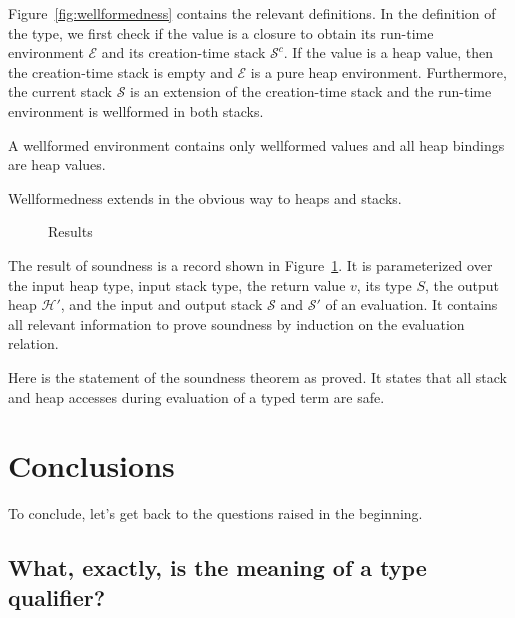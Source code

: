 \documentclass[sigplan,review,dvipsnames,screen,10pt]{acmart}
\begin{document}
Figure~\ref{fig:wellformedness} contains the relevant definitions. In
the definition of the {\AWellformed} type, we first check if the value
is a closure to obtain its run-time environment $\mathcal{E}$ and its
creation-time stack $\mathcal{S}^c$. If the value is a heap value,
then the creation-time stack is empty and $\mathcal{E}$ is a pure heap
environment. Furthermore, the current stack $\mathcal{S}$ is an
extension of the creation-time stack and the run-time environment is
wellformed in both stacks.

A wellformed environment contains only wellformed values and all heap
bindings are heap values.

Wellformedness extends in the obvious way to heaps and stacks.

\begin{figure}[tp]
  \SoundnessResult  
  \caption{Results}
  \label{fig:soundness-result}
\end{figure}
The result of soundness is a record shown in
Figure~\ref{fig:soundness-result}.
It is parameterized over the input heap type, input stack type, the
return value $v$, its type $S$, the output heap $\mathcal{H}'$, and
the input and output stack $\mathcal{S}$ and $\mathcal{S}'$ of an
evaluation. It contains all relevant information to prove soundness by
induction on the evaluation relation. 

Here is the statement of the soundness theorem as proved.
\EvalSoundness
It states that all stack and heap accesses during evaluation of a
typed term are safe.

\section{Conclusions}
\label{sec:conclusions}

To conclude, let's get back to the questions raised in the beginning.

\subsection*{What, exactly, is the meaning of a type qualifier?}
\end{document}

